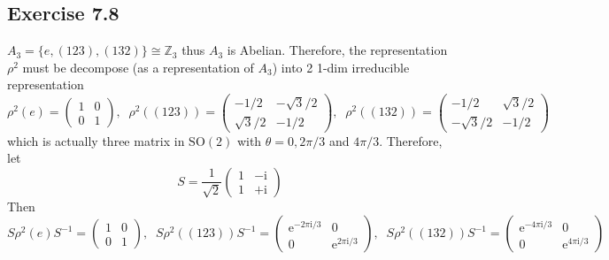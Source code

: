 \documentclass[]{ctexart}
\begin{document}
\subsection{Exercise 7.8}
$A_3=\{e,(123),(132)\}\cong\mathbb Z_3$ thus $A_3$ is Abelian. Therefore, the representation $\rho^2$ must be decompose (as a representation of $A_3$) 
into 2 1-dim irreducible representation 
\begin{equation*}
\rho^2(e)=\begin{pmatrix}
1 & 0\\ 0 & 1
\end{pmatrix},\;\;\rho^2((123))=\begin{pmatrix}
-1/2 & -\sqrt{3}/2\\
\sqrt{3}/2 & -1/2
\end{pmatrix},\;\;\rho^2((132))=\begin{pmatrix}
-1/2 & \sqrt{3}/2\\
-\sqrt{3}/2 & -1/2
\end{pmatrix}
\end{equation*}
which is actually three matrix in $\text{SO}(2)$ with $\theta=0,2\pi/3$ and $4\pi/3$. Therefore, let 
\begin{equation*}
S=\frac{1}{\sqrt{2}}\begin{pmatrix}
1 & -\mathrm{i}\\
1 & +\mathrm{i}
\end{pmatrix}
\end{equation*}
Then 
\begin{equation*}
S\rho^2(e)S^{-1}=\begin{pmatrix}
1 & 0\\ 
0 & 1
\end{pmatrix},\;\;S\rho^2((123))S^{-1}=\begin{pmatrix}
\mathrm{e}^{-2\pi\mathrm{i}/3} & 0\\
0 & \mathrm{e}^{2\pi\mathrm{i}/3}
\end{pmatrix},\;\;S\rho^2((132))S^{-1}=\begin{pmatrix}
\mathrm{e}^{-4\pi\mathrm{i}/3} & 0\\
0 & \mathrm{e}^{4\pi\mathrm{i}/3}
\end{pmatrix}
\end{equation*}
\end{document}
